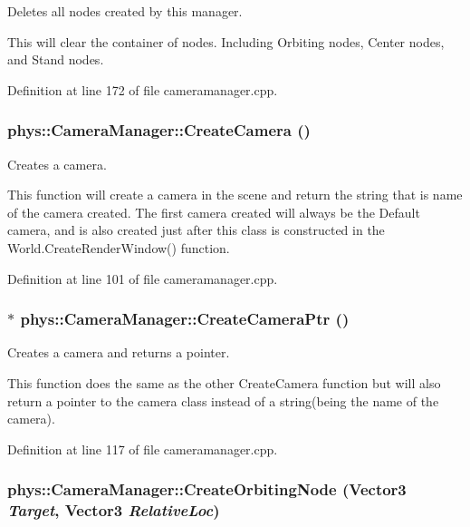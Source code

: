 Deletes all nodes created by this manager. 

This will clear the container of nodes. Including Orbiting nodes, Center nodes, and Stand nodes. 

Definition at line 172 of file cameramanager.cpp.

\hypertarget{classphys_1_1CameraManager_ac6ff80c91fa5a2cd21ebd8b78db9add2}{
\subsubsection[{CreateCamera}]{ phys::CameraManager::CreateCamera ()}}
\label{d9/d91/classphys_1_1CameraManager_ac6ff80c91fa5a2cd21ebd8b78db9add2}


Creates a camera. 

This function will create a camera in the scene and return the string that is name of the camera created. The first camera created will always be the Default camera, and is also created just after this class is constructed in the World.CreateRenderWindow() function. 

Definition at line 101 of file cameramanager.cpp.

\hypertarget{classphys_1_1CameraManager_ae51f79b63b5c34959bc4cfbef34b8f08}{
\subsubsection[{CreateCameraPtr}]{ $\ast$ phys::CameraManager::CreateCameraPtr ()}}
\label{d9/d91/classphys_1_1CameraManager_ae51f79b63b5c34959bc4cfbef34b8f08}


Creates a camera and returns a pointer. 

This function does the same as the other CreateCamera function but will also return a pointer to the camera class instead of a string(being the name of the camera). 

Definition at line 117 of file cameramanager.cpp.

\hypertarget{classphys_1_1CameraManager_a9a696ea09f174a69bbc6d0bb179b3de4}{
\subsubsection[{CreateOrbitingNode}]{ phys::CameraManager::CreateOrbitingNode ({\bf Vector3} {\em Target}, \/  {\bf Vector3} {\em RelativeLoc})}}
\label{d9/d91/classphys_1_1CameraManager_a9a696ea09f174a69bbc6d0bb179b3de4}


